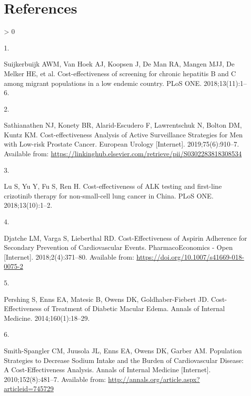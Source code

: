 \documentclass[
]{article}
\newlength{\cslhangindent}
\newlength{\csllabelwidth}
\newenvironment{CSLReferences}[2] %
 {%
  \setlength{\parindent}{0pt}
  \ifodd #1 \everypar{\setlength{\hangindent}{\cslhangindent}}\ignorespaces\fi
  \ifnum #2 > 0
  \setlength{\parskip}{#2\baselineskip}
  \fi
 }%
 {}
\newcommand{\CSLLeftMargin}[1]{\parbox[t]{\csllabelwidth}{#1}}
\newcommand{\CSLRightInline}[1]{\parbox[t]{\linewidth - \csllabelwidth}{#1}\break}
\begin{document}
\hypertarget{references}{%
\section*{References}\label{references}}

\hypertarget{refs}{}
\begin{CSLReferences}{0}{0}
\leavevmode\hypertarget{ref-Suijkerbuijk2018}{}%
\CSLLeftMargin{1. }
\CSLRightInline{Suijkerbuijk AWM, Van Hoek AJ, Koopsen J, De Man RA, Mangen MJJ, De Melker HE, et al. {Cost-effectiveness of screening for chronic hepatitis B and C among migrant populations in a low endemic country}. PLoS ONE. 2018;13(11):1--6. }

\leavevmode\hypertarget{ref-Sathianathen2018a}{}%
\CSLLeftMargin{2. }
\CSLRightInline{Sathianathen NJ, Konety BR, Alarid-Escudero F, Lawrentschuk N, Bolton DM, Kuntz KM. {Cost-effectiveness Analysis of Active Surveillance Strategies for Men with Low-risk Prostate Cancer}. European Urology {[}Internet{]}. 2019;75(6):910--7. Available from: \url{https://linkinghub.elsevier.com/retrieve/pii/S0302283818308534}}

\leavevmode\hypertarget{ref-Lu2018b}{}%
\CSLLeftMargin{3. }
\CSLRightInline{Lu S, Yu Y, Fu S, Ren H. {Cost-effectiveness of ALK testing and first-line crizotinib therapy for non-small-cell lung cancer in China}. PLoS ONE. 2018;13(10):1--2. }

\leavevmode\hypertarget{ref-Djatche2018}{}%
\CSLLeftMargin{4. }
\CSLRightInline{Djatche LM, Varga S, Lieberthal RD. {Cost-Effectiveness of Aspirin Adherence for Secondary Prevention of Cardiovascular Events}. PharmacoEconomics - Open {[}Internet{]}. 2018;2(4):371--80. Available from: \url{https://doi.org/10.1007/s41669-018-0075-2}}

\leavevmode\hypertarget{ref-Pershing2014}{}%
\CSLLeftMargin{5. }
\CSLRightInline{Pershing S, Enns EA, Matesic B, Owens DK, Goldhaber-Fiebert JD. {Cost-Effectiveness of Treatment of Diabetic Macular Edema}. Annals of Internal Medicine. 2014;160(1):18--29. }

\leavevmode\hypertarget{ref-Smith-Spangler2010}{}%
\CSLLeftMargin{6. }
\CSLRightInline{Smith-Spangler CM, Juusola JL, Enns EA, Owens DK, Garber AM. {Population Strategies to Decrease Sodium Intake and the Burden of Cardiovascular Disease: A Cost-Effectiveness Analysis}. Annals of Internal Medicine {[}Internet{]}. 2010;152(8):481--7. Available from: \url{http://annals.org/article.aspx?articleid=745729}}


\end{CSLReferences}
\end{document}
